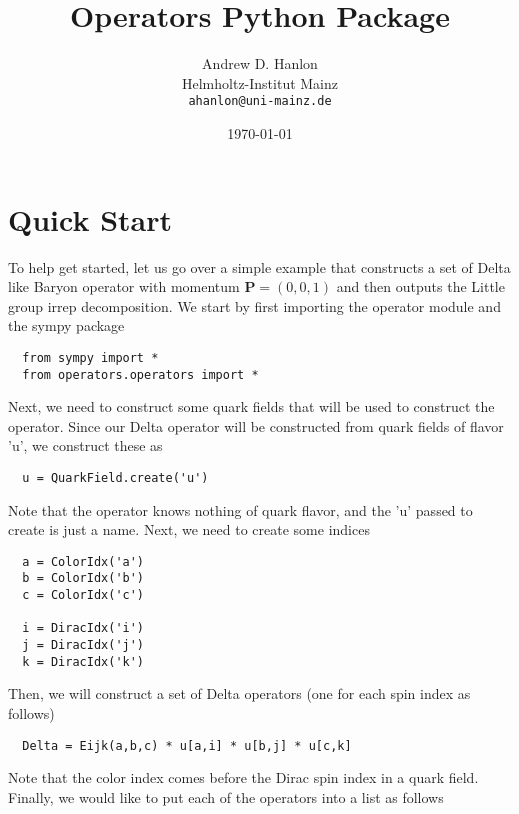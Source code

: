 \documentclass[12pt]{article}
\begin{document}
\title{\bf Operators Python Package}
\author{Andrew D. Hanlon\\
  Helmholtz-Institut Mainz\\
  \texttt{ahanlon@uni-mainz.de}}
\date{\today}
\maketitle


\section{Quick Start}

To help get started, let us go over a simple example that constructs a set of Delta like Baryon operator
with momentum $\bm{P} = (0,0,1)$ and then outputs the Little group irrep decomposition.
We start by first importing the operator module and the sympy package

\begin{lstlisting}
  from sympy import *
  from operators.operators import *
\end{lstlisting}

Next, we need to construct some quark fields that will be used to construct the operator. Since our
Delta operator will be constructed from quark fields of flavor 'u', we construct these as

\begin{lstlisting}
  u = QuarkField.create('u')
\end{lstlisting}

Note that the operator knows nothing of quark flavor, and the 'u' passed to create is just a name.
Next, we need to create some indices

\begin{lstlisting}
  a = ColorIdx('a')
  b = ColorIdx('b')
  c = ColorIdx('c')

  i = DiracIdx('i')
  j = DiracIdx('j')
  k = DiracIdx('k')
\end{lstlisting}

Then, we will construct a set of Delta operators (one for each spin index as follows)

\begin{lstlisting}
  Delta = Eijk(a,b,c) * u[a,i] * u[b,j] * u[c,k]
\end{lstlisting}

Note that the color index comes before the Dirac spin index in a quark field.
Finally, we would like to put each of the operators into a list as follows
\end{document}
